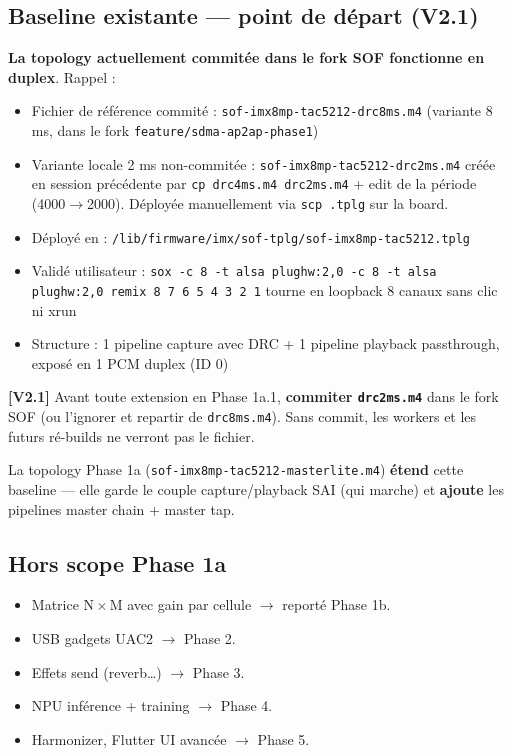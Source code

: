 \documentclass[11pt,a4paper]{article}
\begin{document}
\subsection{Baseline existante --- point de départ (V2.1)}
\textbf{La topology actuellement commitée dans le fork SOF fonctionne en duplex}. Rappel :
\begin{itemize}[leftmargin=*, itemsep=1pt]
  \item Fichier de référence commité : \texttt{sof-imx8mp-tac5212-drc8ms.m4} (variante 8 ms, dans le fork \texttt{feature/sdma-ap2ap-phase1})
  \item Variante locale 2 ms non-commitée : \texttt{sof-imx8mp-tac5212-drc2ms.m4} créée en session précédente par \texttt{cp drc4ms.m4 drc2ms.m4} + edit de la période (4000$\rightarrow$2000). Déployée manuellement via \texttt{scp .tplg} sur la board.
  \item Déployé en : \texttt{/lib/firmware/imx/sof-tplg/sof-imx8mp-tac5212.tplg}
  \item Validé utilisateur : \texttt{sox -c 8 -t alsa plughw:2,0 -c 8 -t alsa plughw:2,0 remix 8 7 6 5 4 3 2 1} tourne en loopback 8 canaux sans clic ni xrun
  \item Structure : 1 pipeline capture avec DRC + 1 pipeline playback passthrough, exposé en 1 PCM duplex (ID 0)
\end{itemize}
\textbf{[V2.1]} Avant toute extension en Phase 1a.1, \textbf{commiter \texttt{drc2ms.m4}} dans le fork SOF (ou l'ignorer et repartir de \texttt{drc8ms.m4}). Sans commit, les workers et les futurs ré-builds ne verront pas le fichier.

La topology Phase 1a (\texttt{sof-imx8mp-tac5212-masterlite.m4}) \textbf{étend} cette baseline --- elle garde le couple capture/playback SAI (qui marche) et \textbf{ajoute} les pipelines master chain + master tap.

\subsection{Hors scope Phase 1a}
\begin{itemize}[leftmargin=*, itemsep=2pt]
  \item \textcolor{red!70!black}{Matrice N\,$\times$\,M avec gain par cellule} $\rightarrow$ reporté Phase 1b.
  \item USB gadgets UAC2 $\rightarrow$ Phase 2.
  \item Effets send (reverb\ldots) $\rightarrow$ Phase 3.
  \item NPU inférence + training $\rightarrow$ Phase 4.
  \item Harmonizer, Flutter UI avancée $\rightarrow$ Phase 5.
\end{itemize}
\end{document}
